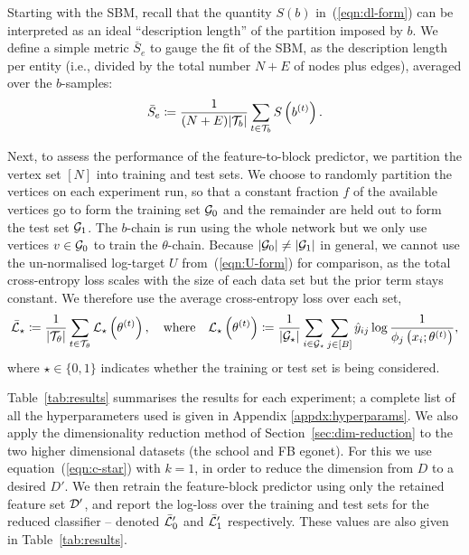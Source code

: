 Starting with the SBM, recall that the quantity $S(b)$ in~(\ref{eqn:dl-form}) 
can be interpreted as an ideal ``description length'' of the partition 
imposed by $b$. We define a simple
metric $\bar{S}_e$ to gauge the fit of the SBM,
as the description length per entity 
(i.e., divided by the total number $N+E$ of 
nodes plus edges),
averaged over the $b$-samples:
%
\begin{equation}
	\bar{S}_e \coloneqq \frac{1}{(N+E) |\mathcal{T}_b|} \sum_{t\in \mathcal{T}_b} S \left( b^{(t)} \right).
	\label{eqn:mean-dl}
\end{equation}
%

Next, to assess the performance of the feature-to-block predictor, 
we partition the vertex set $[N]$ into training and test sets. We choose to 
randomly partition the vertices on each experiment run,
so that a constant fraction $f$ of the available vertices go to form 
the training set $\mathcal{G}_0$ and the remainder are held out to form the
test set $\mathcal{G}_1$.
The $b$-chain is run using the whole network but we only use vertices $v \in \mathcal{G}_0$ to train the $\theta$-chain. Because $|\mathcal{G}_0| \neq |\mathcal{G}_1|$ in general, we cannot use the un-normalised log-target $U$ from~(\ref{eqn:U-form}) for comparison,
as the total cross-entropy loss scales with the size of each data set but 
the prior term stays constant. We therefore use the average cross-entropy loss 
over each set,
%
\begin{equation}
	\bar{\mathcal{L}}_\star \coloneqq \frac{1}{|\mathcal{T}_\theta|} \sum_{t \in \mathcal{T}_\theta} \mathcal{L}_\star \left( \theta^{(t)} \right),
	\quad \textrm{where} \quad
	\mathcal{L}_\star \left( \theta^{(t)} \right) \coloneqq \frac{1}{|\mathcal{G}_\star|} \sum_{i \in \mathcal{G}_\star}\sum_{j \in [B]} \hat{y}_{ij} \log \frac{1}{\phi_j \left(x_i; \theta^{(t)} \right)},
	\label{eqn:cross-entropy-loss}
\end{equation}
%
where $\star \in \{0, 1\}$ indicates whether the training or test
set is being considered.

Table~\ref{tab:results} summarises the results for each experiment;
a complete list of all the hyperparameters used 
is given in Appendix \ref{appdx:hyperparams}. We also apply the 
dimensionality reduction method 
of Section~\ref{sec:dim-reduction}
to the two higher dimensional datasets (the school and FB egonet). 
For this we use equation~(\ref{eqn:c-star}) with $k=1$,
in order to reduce the dimension from 
$D$ to a desired $D'$. 
We then retrain the feature-block predictor using only the retained 
feature set $\mathcal{D}'$, and report the log-loss over the training and 
test sets for the reduced classifier -- 
denoted $\bar{\mathcal{L}}_0'$ and $\bar{\mathcal{L}}_1'$ respectively. 
These values are also given in Table~\ref{tab:results}.


